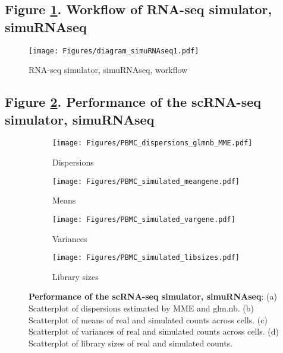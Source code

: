 \documentclass[
]{article}
\begin{document}
\hypertarget{figure-.-workflow-of-rna-seq-simulator-simurnaseq}{%
\subsection{\texorpdfstring{Figure \ref{fig:simuRNAseq}. Workflow of
RNA-seq simulator,
simuRNAseq}{Figure . Workflow of RNA-seq simulator, simuRNAseq}}\label{figure-.-workflow-of-rna-seq-simulator-simurnaseq}}

\begin{figure}
\centering
\texttt{[image: Figures/diagram\_simuRNAseq1.pdf]}
\caption{RNA-seq simulator, simuRNAseq, workflow \label{fig:simuRNAseq}}
\end{figure}

\hypertarget{figure-.-performance-of-the-scrna-seq-simulator-simurnaseq}{%
\subsection{\texorpdfstring{Figure \ref{fig:simuRNAseq_perform}.
Performance of the scRNA-seq simulator,
simuRNAseq}{Figure . Performance of the scRNA-seq simulator, simuRNAseq}}\label{figure-.-performance-of-the-scrna-seq-simulator-simurnaseq}}

\begin{figure}[htb]
     \centering
     \begin{subfigure}[b]{0.45\textwidth}
         \centering
         \texttt{[image: Figures/PBMC\_dispersions\_glmnb\_MME.pdf]}
         \caption{Dispersions}
     \end{subfigure}
     \begin{subfigure}[b]{0.45\textwidth}
         \centering
         \texttt{[image: Figures/PBMC\_simulated\_meangene.pdf]}
         \caption{Means}
     \end{subfigure}
     \begin{subfigure}[b]{0.45\textwidth}
         \centering
         \texttt{[image: Figures/PBMC\_simulated\_vargene.pdf]}
         \caption{Variances}
     \end{subfigure}
     \begin{subfigure}[b]{0.45\textwidth}
         \centering
         \texttt{[image: Figures/PBMC\_simulated\_libsizes.pdf]}
         \caption{Library sizes}
     \end{subfigure}
     \centering
     \caption{\textbf{Performance of the scRNA-seq simulator, simuRNAseq}: (a) Scatterplot of dispersions estimated by MME and glm.nb. (b) Scatterplot of means of real and simulated counts across cells. (c) Scatterplot of variances of real and simulated counts across cells. (d) Scatterplot of library sizes of real and simulated counts.}
     \label{fig:simuRNAseq_perform}
\end{figure}
\end{document}
